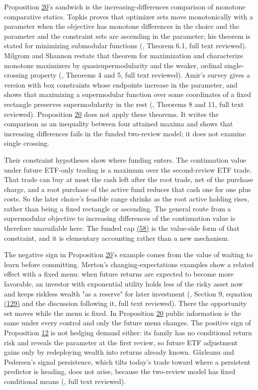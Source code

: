 \documentclass[11pt]{article}
\begin{document}
Proposition \hyperref[res:Proposition-20]{20}'s sandwich is the increasing-differences
comparison of monotone comparative statics. Topkis proves that
optimizer sets move monotonically with a parameter when the
objective has monotone differences in the choice and the
parameter and the constraint sets are ascending in the parameter;
his theorem is stated for minimizing submodular functions
(\cite{topkis1978minimizing}, Theorem 6.1, full text reviewed).
Milgrom and Shannon restate that theorem for maximization and
characterize monotone maximizers by quasisupermodularity and the
weaker, ordinal single-crossing property (\cite{milgrom1994monotone},
Theorems 4 and 5, full text reviewed). Amir's survey gives a
version with box constraints whose endpoints increase in the
parameter, and shows that maximizing a supermodular function over
some coordinates of a fixed rectangle preserves supermodularity in
the rest (\cite{amir2005supermodularity}, Theorems 8 and 11, full text
reviewed). Proposition \hyperref[res:Proposition-20]{20} does not apply these theorems. It writes
the comparison as an inequality between four attained maxima and
shows that increasing differences fails in the funded two-review
model; it does not examine single crossing.

Their constraint hypotheses show where funding enters. The
continuation value under future ETF-only trading is a maximum over
the second-review ETF trade. That trade can buy at most the cash
left after the root trade, net of the purchase charge, and a root
purchase of the active fund reduces that cash one for one plus
costs. So the later choice's feasible range shrinks as the root
active holding rises, rather than being a fixed rectangle or
ascending. The general route from a supermodular objective to
increasing differences of the continuation value is therefore
unavailable here. The funded cap \hyperref[eq:58]{(58)} is the value-side form of
that constraint, and it is elementary accounting rather than a
new mechanism.

The negative sign in Proposition \hyperref[res:Proposition-20]{20}'s example comes from the value
of waiting to learn before committing. Merton's changing-expectations
examples show a related effect with a fixed menu: when future
returns are expected to become more favorable, an investor with
exponential utility holds less of the risky asset now and keeps
riskless wealth "as a reserve" for later investment
(\cite{merton1971optimum}, Section 9, equation \hyperref[eq:129]{(129)} and the discussion
following it, full text reviewed). There the opportunity set moves
while the menu is fixed. In Proposition \hyperref[res:Proposition-20]{20} public information is
the same under every control and only the future menu changes.
The positive sign of Proposition \hyperref[res:Proposition-12]{12} is not hedging demand either:
its family has no conditional return risk and reveals the
parameter at the first review, so future ETF adjustment gains
only by redeploying wealth into returns already known.
Gârleanu and Pedersen's signal persistence, which tilts today's
trade toward where a persistent predictor is heading, does not
arise, because the two-review model has fixed conditional means
(\cite{garleanu2009dynamic}, full text reviewed).
\end{document}
